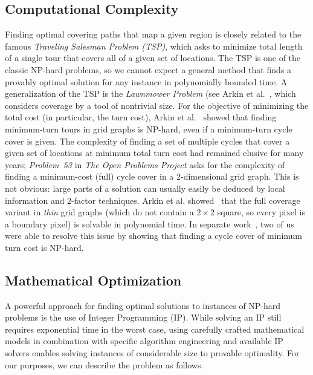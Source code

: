 \subsection{Computational Complexity}
\label{subsec:complexity}
Finding optimal covering paths that map a given region is closely related to the famous 
\emph{Traveling Salesman Problem (TSP)}, which asks to minimize
total length of a single tour that covers all of a given set of locations. The TSP is one of 
the classic NP-hard problems, so we cannot expect a general method that finds
a provably optimal solution for any  instance in polynomially bounded time.
A generalization of the TSP is
the \emph{Lawnmower Problem} (see Arkin et al.~\cite{arkin2000approximation}, which considers coverage by
a tool of nontrivial size. For the objective of minimizing the total cost (in particular, the turn
cost), Arkin et al.~\cite{arkin2005optimal} showed that finding minimum-turn tours in grid graphs is NP-hard,
even if a minimum-turn cycle cover is given. The complexity of finding a set of multiple cycles that cover a 
given set of locations at minimum total turn cost had remained elusive for many years; \emph{Problem~{53}} in \emph{The Open Problems Project}
asks for the complexity of finding a minimum-cost (full) cycle cover in a 2-dimensional grid graph. This is not 
obvious: large parts of a solution can usually easily be deduced by local information and 2-factor techniques.
Arkin et al. showed~\cite{arkin2005optimal,arkin2001optimal} that the full coverage variant in {\em thin} grid graphs (which do not contain a $2\times 2$ square,
so every pixel is a boundary pixel) is solvable in polynomial time. In separate work~\cite{dom3}, two of us were able to resolve this
issue by showing that finding a cycle cover of minimum turn cost is  NP-hard.

\subsection{Mathematical Optimization}
\label{subsec:complexity}
A powerful approach for finding optimal solutions to instances of NP-hard problems is the use
of Integer Programming (IP). While solving an IP still requires exponential time in the worst case,
using carefully crafted mathematical models in combination with specific algorithm engineering and available
IP solvers enables solving instances of considerable size to provable optimality.
For our purposes, we can describe the problem as follows. 

